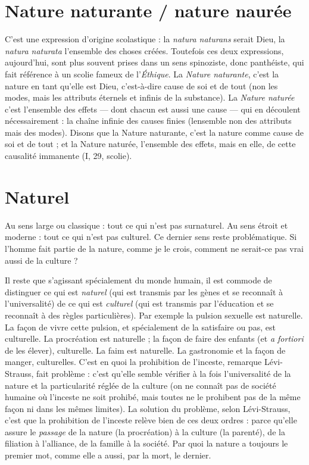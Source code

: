 \section{Nature naturante / nature naurée}
C’est une expression d’origine scolastique : la {\it natura
naturans} serait Dieu, la {\it natura naturata} l'ensemble des choses créées. Toutefois
ces deux expressions, aujourd’hui, sont plus souvent prises dans un sens spinoziste,
donc panthéiste, qui fait référence à un scolie fameux de l’{\it Éthique}. La
{\it Nature naturante}, c’est la nature en tant qu’elle est Dieu, c’est-à-dire cause de
soi et de tout (non les modes, mais les attributs éternels et infinis de la substance).
La {\it Nature naturée} c’est l’ensemble des effets — dont chacun est aussi une
cause — qui en découlent nécessairement : la chaîne infinie des causes finies
(lensemble non des attributs mais des modes). Disons que la Nature naturante,
c’est la nature comme cause de soi et de tout ; et la Nature naturée,
l’ensemble des effets, mais en elle, de cette causalité immanente (I, 29, scolie).

\section{Naturel}
Au sens large ou classique : tout ce qui n’est pas surnaturel. Au
sens étroit et moderne : tout ce qui n’est pas culturel. Ce dernier
sens reste problématique. Si l’homme fait partie de la nature, comme je le crois,
comment ne serait-ce pas vrai aussi de la culture ?

Il reste que s’agissant spécialement du monde humain, il est commode de
distinguer ce qui est {\it naturel} (qui est transmis par les gènes et se reconnaît à
l’universalité) de ce qui est {\it culturel} (qui est transmis par l'éducation et se reconnaît
à des règles particulières). Par exemple la pulsion sexuelle est naturelle. La
façon de vivre cette pulsion, et spécialement de la satisfaire ou pas, est culturelle.
La procréation est naturelle ; la façon de faire des enfants (et {\it a fortiori} de
les élever), culturelle. La faim est naturelle. La gastronomie et la façon de
manger, culturelles. C’est en quoi la prohibition de l'inceste, remarque Lévi-Strauss,
fait problème : c’est qu’elle semble vérifier à la fois l’universalité de la
nature et la particularité réglée de la culture (on ne connaît pas de société
humaine où l'inceste ne soit prohibé, mais toutes ne le prohibent pas de la
même façon ni dans les mêmes limites). La solution du problème, selon Lévi-Strauss,
c’est que la prohibition de l'inceste relève bien de ces deux ordres :
parce qu’elle assure le {\it passage} de la nature (la procréation) à la culture (la
parenté), de la filiation à l'alliance, de la famille à la société. Par quoi la nature
a toujours le premier mot, comme elle a aussi, par la mort, le dernier.

